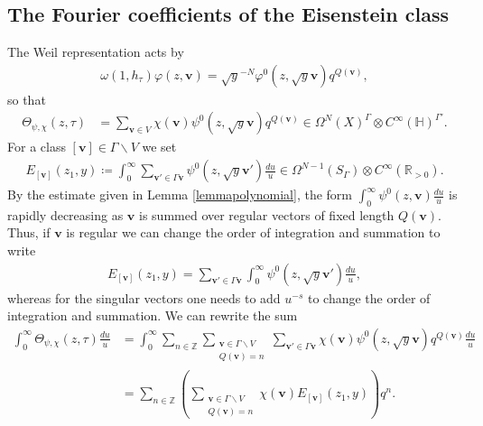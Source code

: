 \documentclass[a4paper,11pt]{amsart} %
\newcommand{\8}{\infty}
\newcommand{\Z}{\mathbb{Z}}
\newcommand{\vbf}{\mathbf{v}}
\newcommand{\HH}{\mathbb{H}}
\newcommand{\R}{\mathbb{R}}
\theoremstyle{mytheoremstyle}
\theoremstyle{remark}
\numberwithin{equation}{section}
\begin{document}
\subsection{The Fourier coefficients of the Eisenstein class} \label{sec:fourierexpansion} The Weil representation acts by
\begin{align}   \omega(1,h_\tau)\varphi(z,\vbf)=\sqrt{y}^{-N}\varphi^0(z,\sqrt{y}\vbf)q^{Q(\vbf)},
\end{align}
so that
\begin{align}
\Theta_{\psi, \chi}(z,\tau) & = \sum_{\vbf \in V}  \chi(\vbf) \psi^0(z,\sqrt{y}\vbf)q^{Q(\vbf)} \in \Omega^N(X)^\Gamma \otimes C^\8(\HH)^{\Gamma'}.
\end{align}
For a class $[\vbf] \in \Gamma \backslash V$ we set
\begin{align}
E_{[\vbf]}(z_1,y)\coloneqq \int_0^\8 \sum_{\vbf' \in \Gamma \vbf}  \psi^0(z,\sqrt{y}\vbf')\frac{du}{u} \in \Omega^{N-1}(S_\Gamma) \otimes C^\8(\R_{>0}).
\end{align}
By the estimate given in Lemma \ref{lemmapolynomial}, the form $\int_0^\8\psi^0(z,\vbf)\frac{du}{u}$ is rapidly decreasing as $\vbf$ is summed over regular vectors of fixed length $Q(\vbf)$. Thus, if $\vbf$ is regular we can change the order of integration and summation to write
\begin{align}
E_{[\vbf]}(z_1,y)=  \sum_{\vbf' \in \Gamma \vbf}  \int_0^\8 \psi^0(z,\sqrt{y}\vbf')\frac{du}{u},
\end{align}
whereas for the singular vectors one needs to add $u^{-s}$ to change the order of integration and summation. We can rewrite the sum
\begin{align}
\int_0^\8 \Theta_{\psi, \chi}(z,\tau)\frac{du}{u} & = \int_0^\8 \sum_{n \in \Z} \sum_{\substack{\vbf \in \Gamma \backslash V \\ Q(\vbf)=n}} \sum_{\vbf' \in \Gamma \vbf}  \chi(\vbf) \psi^0(z,\sqrt{y}\vbf)q^{Q(\vbf)} \frac{du}{u} \\
&=  \sum_{n \in \Z} \left ( \sum_{\substack{\vbf \in \Gamma \backslash V \\ Q(\vbf)=n}} \chi(\vbf) E_{[\vbf]}(z_1,y) \right )q^n.
\end{align}
\end{document}
